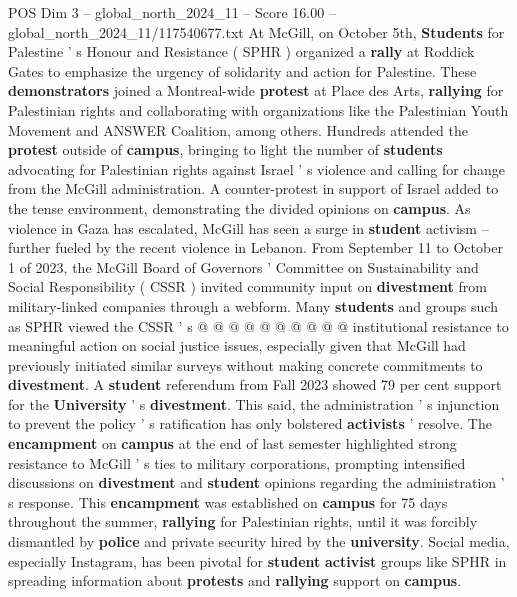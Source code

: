 \begin{textsample}{POS Dim 3 – global\_north\_2024\_11 – Score 16.00 – global\_north\_2024\_11/117540677.txt}  \label{ex:f3_pos_179}
At McGill, on October 5th, \textbf{Students} for Palestine ' s Honour and Resistance ( SPHR ) organized a \textbf{rally} at Roddick Gates to emphasize the urgency of solidarity and action for Palestine.
These \textbf{demonstrators} joined a Montreal-wide \textbf{protest} at Place des Arts, \textbf{rallying} for Palestinian rights and collaborating with organizations like the Palestinian Youth Movement and ANSWER Coalition, among others.
Hundreds attended the \textbf{protest} outside of \textbf{campus}, bringing to light the number of \textbf{students} advocating for Palestinian rights against Israel ' s violence and calling for change from the McGill administration.
A counter-protest in support of Israel added to the tense environment, demonstrating the divided opinions on \textbf{campus}.
As violence in Gaza has escalated, McGill has seen a surge in \textbf{student} activism -- further fueled by the recent violence in Lebanon.
From September 11 to October 1 of 2023, the McGill Board of Governors ' Committee on Sustainability and Social Responsibility ( CSSR ) invited community input on \textbf{divestment} from military-linked companies through a webform.
Many \textbf{students} and groups such as SPHR viewed the CSSR ' s @ @ @ @ @ @ @ @ @ @ institutional resistance to meaningful action on social justice issues, especially given that McGill had previously initiated similar surveys without making concrete commitments to \textbf{divestment}.
A \textbf{student} referendum from Fall 2023 showed 79 per cent support for the \textbf{University} ' s \textbf{divestment}.
This said, the administration ' s injunction to prevent the policy ' s ratification has only bolstered \textbf{activists} ' resolve.
The \textbf{encampment} on \textbf{campus} at the end of last semester highlighted strong resistance to McGill ' s ties to military corporations, prompting intensified discussions on \textbf{divestment} and \textbf{student} opinions regarding the administration ' s response.
This \textbf{encampment} was established on \textbf{campus} for 75 days throughout the summer, \textbf{rallying} for Palestinian rights, until it was forcibly dismantled by \textbf{police} and private security hired by the \textbf{university}.
Social media, especially Instagram, has been pivotal for \textbf{student} \textbf{activist} groups like SPHR in spreading information about \textbf{protests} and \textbf{rallying} support on \textbf{campus}.

\end{textsample}
